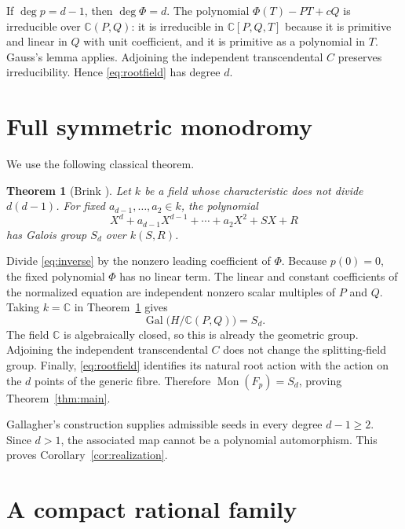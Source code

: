 \documentclass[11pt]{article}
\newtheorem{theorem}{Theorem}
\theoremstyle{remark}
\newcommand{\C}{\mathbb C}
\newcommand{\Mon}{\operatorname{Mon}}
\newcommand{\Gal}{\operatorname{Gal}}
\begin{document}
If $\deg p=d-1$, then $\deg\Phi=d$.  The polynomial
$\Phi(T)-PT+cQ$ is irreducible over $\C(P,Q)$: it is irreducible in
$\C[P,Q,T]$ because it is primitive and linear in $Q$ with unit
coefficient, and it is primitive as a polynomial in $T$.  Gauss's lemma
applies.  Adjoining the independent transcendental $C$ preserves
irreducibility.  Hence \eqref{eq:rootfield} has degree $d$.

\section{Full symmetric monodromy}

We use the following classical theorem.

\begin{theorem}[Brink {\cite[Theorem 13]{Brink}}]\label{thm:brink}
Let $k$ be a field whose characteristic does not divide $d(d-1)$.  For
fixed $a_{d-1},\ldots,a_2\in k$, the polynomial
\[
 X^d+a_{d-1}X^{d-1}+\cdots+a_2X^2+SX+R
\]
has Galois group $S_d$ over $k(S,R)$.
\end{theorem}

Divide \eqref{eq:inverse} by the nonzero leading coefficient of $\Phi$.
Because $p(0)=0$, the fixed polynomial $\Phi$ has no linear term.  The
linear and constant coefficients of the normalized equation are independent
nonzero scalar multiples of $P$ and $Q$.  Taking $k=\C$ in
Theorem~\ref{thm:brink} gives
\begin{equation}
 \Gal\bigl(H/\C(P,Q)\bigr)=S_d.                     \label{eq:galois}
\end{equation}
The field $\C$ is algebraically closed, so this is already the geometric
group.  Adjoining the independent transcendental $C$ does not change the
splitting-field group.  Finally, \eqref{eq:rootfield} identifies its natural
root action with the action on the $d$ points of the generic fibre.
Therefore $\Mon(F_p)=S_d$, proving Theorem~\ref{thm:main}.

Gallagher's construction supplies admissible seeds in every degree
$d-1\ge2$.  Since $d>1$, the associated map cannot be a polynomial
automorphism.  This proves Corollary~\ref{cor:realization}.

\section{A compact rational family}
\end{document}

